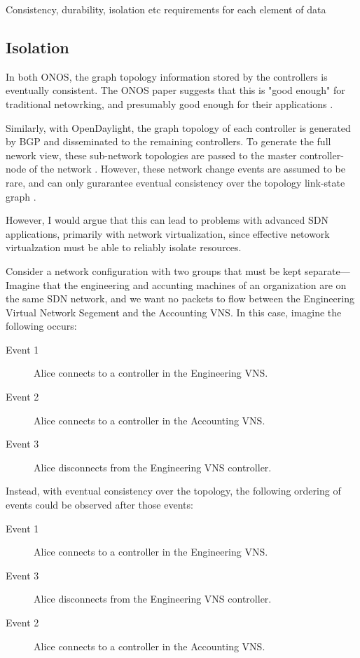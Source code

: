 \documentclass[letterpaper,twocolumn,10pt]{article}
\begin{document}
Consistency, durability, isolation etc requirements for each element of data

\subsection{Isolation}

In both ONOS, the graph topology information stored by the controllers is eventually consistent. The ONOS paper suggests that this is "good enough" for traditional netowrking, and presumably good enough for their applications \cite{berde2014onos}. 

Similarly, with OpenDaylight, the graph topology of each controller is generated by BGP and disseminated to the remaining controllers. To generate the full nework view, these sub-network topologies are passed to the master controller-node of the network \cite{ONV:wiki}. However, these network change events are assumed to be rare, and can only gurarantee eventual consistency over the topology link-state graph \cite{bgp:rfc}.

However, I would argue that this can lead to problems with advanced SDN applications, primarily with network virtualization, since effective netowork virtualzation must be able to reliably isolate resources.

Consider a network configuration with two groups that must be kept separate---Imagine that the engineering and accunting machines of an organization are on the same SDN network, and we want no packets to flow between the Engineering Virtual Network Segement and the Accounting VNS. In this case, imagine the following occurs:

\begin{description}
\item [Event 1] Alice connects to a controller in the Engineering VNS.
\item [Event 2] Alice connects to a controller in the Accounting VNS.
\item [Event 3] Alice disconnects from  the Engineering VNS controller.
\end{description}

Instead, with eventual consistency over the topology, the following ordering of events could be observed after those events:

\begin{description}
\item [Event 1] Alice connects to a controller in the Engineering VNS.
\item [Event 3] Alice disconnects from the Engineering VNS controller.
\item [Event 2] Alice connects to a controller in the Accounting VNS.
\end{description}
\end{document}
